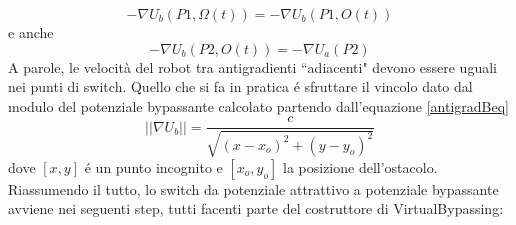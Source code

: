 \documentclass[14pt,a4paper]{extarticle}
\begin{document}
\begin{equation}
\label{vincolo1}
-\nabla U_b(P1,\Omega(t)) = -\nabla U_b(P1,O(t))
\end{equation} e anche 
\begin{equation}
\label{vincolo2}
-\nabla U_b(P2,O(t)) = -\nabla U_a(P2)
\end{equation} A parole, le velocità del robot tra antigradienti ``adiacenti" devono essere uguali nei punti di switch. Quello che si fa in pratica é sfruttare il vincolo dato dal modulo del potenziale bypassante calcolato partendo dall'equazione \ref{antigradBeq} 
\begin{equation}
\label{vincoloc}
||\nabla U_b|| = \frac{c}{\sqrt{(x-x_o)^2+(y-y_o)^2}}
\end{equation} dove \([x,y]\) é un punto incognito e \([x_o,y_o]\) la posizione dell'ostacolo.\\ 
Riassumendo il tutto, lo switch da potenziale attrattivo a potenziale bypassante avviene nei seguenti step, tutti facenti parte del costruttore di VirtualBypassing:
\end{document}
